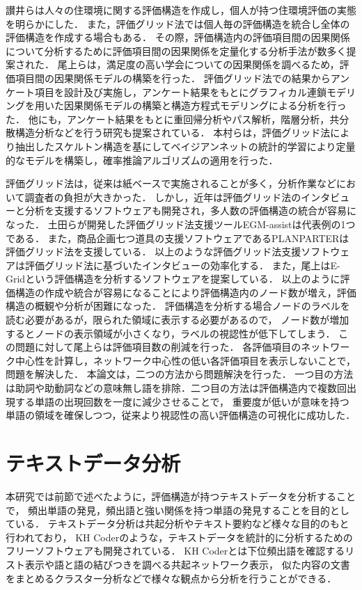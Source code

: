 \documentclass[syuuron]{kuee}
\begin{document}
		讃井らは人々の住環境に関する評価構造を作成し，個人が持つ住環境評価の実態を明らかにした．
		また，評価グリッド法では個人毎の評価構造を統合し全体の評価構造を作成する場合もある．
		その際，評価構造内の評価項目間の因果関係について分析するために評価項目間の因果関係を定量化する分析手法が数多く提案された．
		尾上らは，満足度の高い学会についての因果関係を調べるため，評価項目間の因果関係モデルの構築を行った\cite{egm8}．
		評価グリッド法での結果からアンケート項目を設計及び実施し，アンケート結果をもとにグラフィカル連鎖モデリングを用いた因果関係モデルの構築と構造方程式モデリングによる分析を行った．
		他にも，アンケート結果をもとに重回帰分析やパス解析，階層分析，共分散構造分析などを行う研究も提案されている．
		本村らは，評価グリッド法により抽出したスケルトン構造を基にしてベイジアンネットの統計的学習により定量的なモデルを構築し，確率推論アルゴリズムの適用を行った\cite{egm9}．
		
		評価グリッド法は，従来は紙ベースで実施されることが多く，分析作業などにおいて調査者の負担が大きかった．
		しかし，近年は評価グリッド法のインタビューと分析を支援するソフトウェアも開発され，多人数の評価構造の統合が容易になった．
		土田らが開発した評価グリッド法支援ツールEGM-assistは代表例の1つである\cite{egm11}．
		また，商品企画七つ道具の支援ソフトウェアであるPLANPARTERは評価グリッド法を支援している\cite{egm12}．
		以上のような評価グリッド法支援ソフトウェアは評価グリッド法に基づいたインタビューの効率化する．
		また，尾上はE-Gridという評価構造を分析するソフトウェアを提案している．
		以上のように評価構造の作成や統合が容易になることにより評価構造内のノード数が増え，評価構造の概観や分析が困難になった．
		評価構造を分析する場合ノードのラベルを読む必要があるが，限られた領域に表示する必要があるので，
		ノード数が増加するとノードの表示領域が小さくなり，ラベルの視認性が低下してしまう．
		この問題に対して尾上らは評価項目数の削減を行った\cite{net1}．
		各評価項目のネットワーク中心性を計算し，ネットワーク中心性の低い各評価項目を表示しないことで，問題を解決した．
		本論文は，二つの方法から問題解決を行った．
		一つ目の方法は助詞や助動詞などの意味無し語を排除．二つ目の方法は評価構造内で複数回出現する単語の出現回数を一度に減少させることで，
		重要度が低いが意味を持つ単語の領域を確保しつつ，従来より視認性の高い評価構造の可視化に成功した．
		
	\section{テキストデータ分析}
		本研究では前節で述べたように，評価構造が持つテキストデータを分析することで，
		頻出単語の発見，頻出語と強い関係を持つ単語の発見することを目的としている． 
		テキストデータ分析は共起分析やテキスト要約など様々な目的のもと行われており，
		KH Coderのような，テキストデータを統計的に分析するためのフリーソフトウェアも開発されている．
		KH Coderとは下位頻出語を確認するリスト表示や語と語の結びつきを調べる共起ネットワーク表示，
		似た内容の文書をまとめるクラスター分析などで様々な観点から分析を行うことができる．
		
\end{document}
